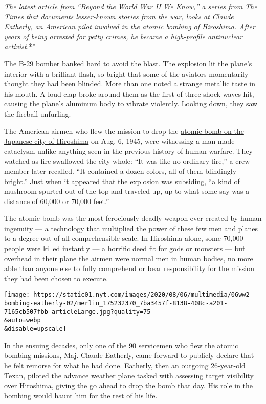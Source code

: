 \emph{\emph{\emph{The latest article from
``}\href{https://www.nytimes.com/spotlight/beyond-wwii}{\emph{Beyond the
World War II We Know}}},'' a series from The Times that documents
lesser-known stories from the war, looks at Claude Eatherly, an American
pilot involved in the atomic bombing of Hiroshima. After years of being
arrested for petty crimes, he became a high-profile antinuclear
activist.}**

The B-29 bomber banked hard to avoid the blast. The explosion lit the
plane's interior with a brilliant flash, so bright that some of the
aviators momentarily thought they had been blinded. More than one noted
a strange metallic taste in his mouth. A loud clap broke around them as
the first of three shock waves hit, causing the plane's aluminum body to
vibrate violently. Looking down, they saw the fireball unfurling.

The American airmen who flew the mission to drop the
\href{https://www.nytimes.com/2020/08/05/world/asia/hiroshima-japan-75th-anniversary.html}{atomic
bomb on the Japanese city of Hiroshima} on Aug. 6, 1945, were witnessing
a man-made cataclysm unlike anything seen in the previous history of
human warfare. They watched as fire swallowed the city whole: ``It was
like no ordinary fire,'' a crew member later recalled. ``It contained a
dozen colors, all of them blindingly bright.'' Just when it appeared
that the explosion was subsiding, ``a kind of mushroom spurted out of
the top and traveled up, up to what some say was a distance of 60,000 or
70,000 feet.''

The atomic bomb was the most ferociously deadly weapon ever created by
human ingenuity --- a technology that multiplied the power of these few
men and planes to a degree out of all comprehensible scale. In Hiroshima
alone, some 70,000 people were killed instantly --- a horrific deed fit
for gods or monsters --- but overhead in their plane the airmen were
normal men in human bodies, no more able than anyone else to fully
comprehend or bear responsibility for the mission they had been chosen
to execute.

\texttt{[image: https://static01.nyt.com/images/2020/08/06/multimedia/06ww2-bombing-eatherly-02/merlin\_175232370\_7ba3457f-8138-408c-a201-7165cb507fbb-articleLarge.jpg?quality=75\\\&auto=webp\\\&disable=upscale]}

In the ensuing decades, only one of the 90 servicemen who flew the
atomic bombing missions, Maj. Claude Eatherly, came forward to publicly
declare that he felt remorse for what he had done. Eatherly, then an
outgoing 26-year-old Texan, piloted the advance weather plane tasked
with assessing target visibility over Hiroshima, giving the go ahead to
drop the bomb that day. His role in the bombing would haunt him for the
rest of his life.

